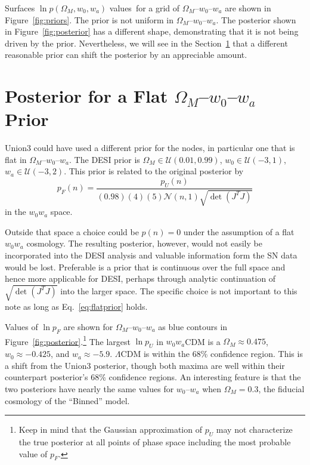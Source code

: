 \documentclass[11pt,a4paper]{article}
\begin{document}
Surfaces   $\ln{p}(\Omega_M, w_0,w_a)$ values\ for a grid of $\Omega_M$--$w_0$--$w_a$ are shown in
Figure~\ref{fig:priors}.   The prior is not uniform in  $\Omega_M$--$w_0$--$w_a$.
The posterior shown in Figure~\ref{fig:posterior} has a different shape,
demonstrating that it is not being driven by the prior.  Nevertheless,
we will see in the  Section~\ref{sec:flatposterior} that a different reasonable prior can shift the posterior
by an appreciable amount.

\section{Posterior for a Flat  $\Omega_M$--$w_0$--$w_a$  Prior}
\label{sec:flatposterior}
Union3 could have used a different prior for the nodes, in particular one
that is flat in $\Omega_M$--$w_0$--$w_a$.
The DESI prior is $\Omega_M \in \mathcal{U}(0.01,0.99)$, $w_0 \in \mathcal{U}(-3,1)$, $w_a \in \mathcal{U}(-3,2)$.
This prior is related to the original posterior by
\begin{equation}
p_F(n) = \frac{p_U(n)}{(0.98)(4)(5) \mathcal{N}(n,1)  \sqrt{\det{\left(J^T J\right)}}}
\label{eq:flatprior}
\end{equation}
in the $w_0w_a$ space.

Outside that space a choice could be $p(n)=0$ under the assumption
of a flat $w_0w_a$ cosmology.  The resulting posterior, however, would not easily be incorporated into the DESI analysis
and valuable information form the SN data would be lost.
Preferable is a prior that is continuous over the full space and hence more applicable for DESI,
perhaps through analytic continuation of $\sqrt{\det{\left(J^T J\right)}}$ into the larger space.
The specific choice is not important to this note as long as Eq.~\ref{eq:flatprior} holds.

Values of $\ln{p}_F$ are shown for  $\Omega_M$--$w_0$--$w_a$ as blue contours in Figure~\ref{fig:posterior}.\footnote{Keep in mind that the Gaussian approximation of $p_U$ may not characterize the true posterior at all points of
phase space including the most probable value of $p_F$.}
The largest $\ln{p_U}$ in $w_0w_a$CDM is a $\Omega_M\approx 0.475$, $w_0 \approx -0.425$, and $w_a \approx -5.9$. $\Lambda$CDM 
is within the 68\% confidence region.  This is a shift from the Union3 posterior, though both maxima are well within their counterpart
posterior's 68\% confidence regions.  An interesting feature is that the two posteriors have nearly the same values for $w_0$--$w_a$ when $\Omega_M=0.3$, the fiducial cosmology of the ``Binned'' model.
\end{document}
